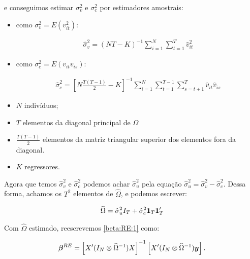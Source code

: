 \documentclass[11pt,oneside,a4paper]{article}
\numberwithin{equation}{section}
\begin{document}
\noindent
e conseguimos estimar $\sigma_{v}^{2}$ e $\sigma_{c}^{2}$ por estimadores amostrais:

\begin{itemize}\itemsep0pt
\item 
como $\sigma_{v}^{2} = E(v_{it}^{2})$:

\vspace{-1.5 em}
\begin{align*}
\hat{\sigma}_{v}^{2} =
(NT - K)^{-1} 
\sum_{i=1}^{N}
\sum_{t=1}^{T}
\hat{v}_{it}^2
\end{align*}
\vspace{-1.5 em}

\item 
como $\sigma_{c}^{2} = E(v_{it} v_{is})$:

\vspace{-1.5 em}
\begin{align*}
\hat{\sigma}_{c}^{2} =
\left[ N \frac{T ( T-1 )}{2} - K  \right]^{-1}
\sum_{i=1}^{N}
\sum_{t=1}^{T-1}
\sum_{s=t+1}^{T}
\hat{v}_{it} \hat{v}_{is}
\end{align*}
\vspace{-1.5 em}

\item $N$ indivíduos;

\item $T$ elementos da diagonal principal de $\Omega$

\item $\frac{T ( T - 1)}{2}$ elementos da matriz triangular superior dos elementos fora da diagonal.

\item $K$ regressores.
\end{itemize}

Agora que temos $\hat{\sigma}^2_{v}$ e $\hat{\sigma}^2_{c}$ podemos achar $\hat{\sigma}^{2}_{u}$ pela equação $\boxed{\hat{\sigma}_{u}^{2} = \hat{\sigma}_{v}^{2} - \hat{\sigma}_{c}^{2}}$.
Dessa forma, achamos os $T^2$ elementos de $\widehat{\Omega}$, e podemos escrever:

\vspace{-1 em}
\begin{align*}
\widehat{\Omega}
= 
\hat{\sigma}^{2}_{u} I_{T} + \hat{\sigma}_{c}^{2} \boldsymbol{1}_{T} \boldsymbol{1}_{T}'
\end{align*}

Com $\widehat{\Omega}$ estimado, reescrevemos \eqref{beta:RE:1} como:

\vspace{-1 em}
\begin{align} \label{beta:RE:2}
\boldsymbol{\beta}^{RE} = 
\left[ X' (I_{N} \otimes \widehat{\Omega}^{-1}) X \right]^{-1}
\left[ X' (I_{N} \otimes \widehat{\Omega}^{-1}) \boldsymbol{y} \right].
\end{align}
\end{document}
